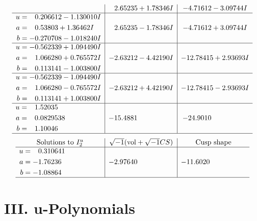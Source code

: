 \documentclass[1p]{elsarticle_modified}
\theoremstyle{definition}
\newcommand{\I}{\sqrt{-1}}
\begin{document}
$$\begin{array}{c|c|c}
 & \phantom{-}2.65235 + 1.78346 I & -4.71612 - 3.09744 I \\ \hline\begin{aligned}
u &= \phantom{-}0.206612 - 1.130010 I \\
a &= \phantom{-}0.53803 + 1.36462 I \\
b &= -0.270708 - 1.018240 I\end{aligned}
 & \phantom{-}2.65235 - 1.78346 I & -4.71612 + 3.09744 I \\ \hline\begin{aligned}
u &= -0.562339 + 1.094490 I \\
a &= \phantom{-}1.066280 + 0.765572 I \\
b &= \phantom{-}0.113141 - 1.003800 I\end{aligned}
 & -2.63212 - 4.42190 I & -12.78415 + 2.93693 I \\ \hline\begin{aligned}
u &= -0.562339 - 1.094490 I \\
a &= \phantom{-}1.066280 - 0.765572 I \\
b &= \phantom{-}0.113141 + 1.003800 I\end{aligned}
 & -2.63212 + 4.42190 I & -12.78415 - 2.93693 I \\ \hline\begin{aligned}
u &= \phantom{-}1.52035\phantom{ +0.000000I} \\
a &= \phantom{-}0.0829538\phantom{ +0.000000I} \\
b &= \phantom{-}1.10046\phantom{ +0.000000I}\end{aligned}
 & -15.4881\phantom{ +0.000000I} & -24.9010\phantom{ +0.000000I}\\
 \hline 
 \end{array}$$\newpage$$\begin{array}{c|c|c}  
\text{Solutions to }I^u_{2}& \I (\text{vol} + \sqrt{-1}CS) & \text{Cusp shape}\\
 \hline 
\begin{aligned}
u &= \phantom{-}0.310641\phantom{ +0.000000I} \\
a &= -1.76236\phantom{ +0.000000I} \\
b &= -1.08864\phantom{ +0.000000I}\end{aligned}
 & -2.97640\phantom{ +0.000000I} & -11.6020\phantom{ +0.000000I}\\
 \hline 
 \end{array}$$\newpage
\newpage\renewcommand{\arraystretch}{1}
\centering \section*{ III. u-Polynomials}
\end{document}
